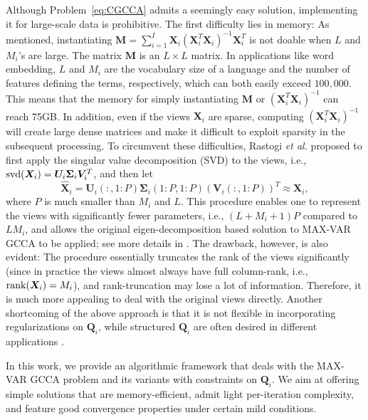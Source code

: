 \documentclass[10pt,journal]{IEEEtran}
\newcommand{\Q}{\boldsymbol{Q}}
\begin{document}
Although Problem~\eqref{eq:CGCCA} admits a seemingly easy solution, implementing it for large-scale data is prohibitive. 
The first difficulty lies in memory: As mentioned, instantiating ${\bm M} = \sum_{i=1}^I{\bm X}_i({\bm X}_i^T{\bm X}_i)^{-1}{\bm X}_i^T$ is not doable when $L$ and $M_i$'s are large. The matrix ${\bm M}$ is an $L\times L$ matrix. In applications like word embedding, $L$ and $M_i$ are the vocabulary size of a language and the number of features defining the terms, respectively, which can both easily exceed $100,000$. This means that the memory for simply instantiating ${\bm M}$ or $({\bm X}_i^T{\bm X}_i)^{-1}$ can reach 75GB.	
In addition, even if the views ${\bm X}_i$ are sparse, computing $({\bm X}_i^T{\bm X}_i)^{-1}$ will create large dense matrices and make it difficult to exploit sparsity in the subsequent processing.
To circumvent these difficulties, Rastogi \emph{et al.} \cite{rastogimultiview} proposed to first apply the singular value decomposition (SVD) to the views, i.e., ${\rm svd}({\bm X}_i)={\bm U}_i{\bm \Sigma}_i{\bm V}_i^T$, and then let 
	\[\hat{\bm X}_i = {\bm U}_i(:,1:P){\bm \Sigma}_i(1:P,1:P)({\bm V}_i(:,1:P))^T \approx {\bm X}_i,\]
where $P$ is much smaller than $M_i$ and $L$.
This procedure enables one to represent the views with significantly fewer parameters, i.e., $(L+M_i+1)P$ compared to $LM_i$,
and allows the original eigen-decomposition based solution to MAX-VAR GCCA to be applied; see more details in \cite{rastogimultiview}.	The drawback, however, is also evident: The procedure essentially truncates the rank of the views significantly (since in practice the views almost always have full column-rank, i.e., ${\rm rank}({\bm X}_i)=M_i$), and rank-truncation may lose a lot of information. Therefore, it is much more appealing to deal with the original views directly. 
Another shortcoming of the above approach is that it is not flexible in incorporating regularizations on $\Q_i$, while structured $\Q_i$ are often desired in different applications \cite{witten2009penalized,chen2012structured,witten2009extensions}.

In this work, we provide an algorithmic framework that deals with the MAX-VAR GCCA problem and its variants with constraints on $\Q_i$.
We aim at offering
simple solutions that are memory-efficient, admit light per-iteration complexity, and feature good convergence properties under certain mild conditions.
\end{document}
